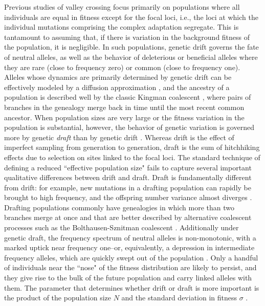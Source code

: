 \documentclass[10pt,twocolumn,twoside]{gsajnl}
\begin{document}
\begin{spacing}{1.5}
Previous studies of valley crossing focus primarily on populations where all individuals are equal in fitness except for the focal loci, i.e., the loci at which the individual mutations comprising the complex adaptation segregate.
This is tantamount to assuming that, if there is variation in the background fitness of the population, it is negligible.
In such populations, genetic drift governs the fate of neutral alleles, as well as the behavior of deleterious or beneficial alleles where they are rare (close to frequency zero) or common (close to frequency one).
Alleles whose dynamics are primarily determined by genetic drift can be effectively modeled by a diffusion approximation \citep{Wright:1945,Kimura:1955,Kimura:1957}, and the ancestry of a population is described well by the classic Kingman coalescent \citep{Kingman:1982}, where pairs of branches in the genealogy merge back in time until the most recent common ancestor.
When population sizes are very large or the fitness variation in the population is substantial, however, the behavior of genetic variation is governed more by genetic \emph{draft} than by genetic drift \citep{gillespie_2000, gillespie_2001, masel_2011, neher_shraiman_2011}.
Whereas drift is the effect of imperfect sampling from generation to generation, draft is the sum of hitchhiking effects due to selection on sites linked to the focal loci.
The standard technique of defining a reduced ``effective population size" fails to capture several important qualitative differences between drift and draft.
Draft is fundamentally different from drift: for example, new mutations in a drafting population can rapidly be brought to high frequency, and the offspring number variance almost diverges \citep{neher_shraiman_2011}.
Drafting populations commonly have genealogies in which more than two branches merge at once and that are better described by alternative coalescent processes such as the Bolthausen-Sznitman coalescent \citep{neher_hallatschek_2013, brunet_2007, schweinsberg_2017}.
Additionally under genetic draft, the frequency spectrum of neutral alleles is non-monotonic, with a marked uptick near frequency one--or, equivalently, a depression in intermediate frequency alleles, which are quickly swept out of the population \citep{neher_shraiman_2011,kosheleva_2013,neher_hallatschek_2013}.
Only a handful of individuals near the ``nose" of the fitness distribution are likely to persist, and they give rise to the bulk of the future population and carry linked alleles with them.
The parameter that determines whether drift or draft is more important is the product of the population size $N$ and the standard deviation in fitness $\sigma$ \citep{neher_hallatschek_2013}.


\end{spacing}
\end{document}
